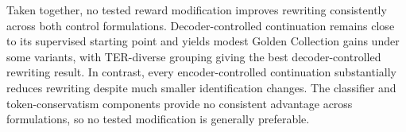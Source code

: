 Taken together, no tested reward modification improves rewriting consistently
across both control formulations. Decoder-controlled continuation remains close
to its supervised starting point and yields modest Golden Collection gains
under some variants, with TER-diverse grouping giving the best
decoder-controlled rewriting result. In contrast, every encoder-controlled
continuation substantially reduces rewriting despite much smaller identification
changes. The classifier and token-conservatism components provide no consistent
advantage across formulations, so no tested modification is generally
preferable.
